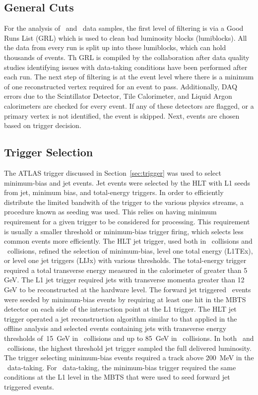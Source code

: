 
\subsection{General Cuts}
For the analysis of \pp\ and \pPb\ data samples, the first level of filtering is via a Good Runs List (GRL) which is used to clean bad luminosity blocks (lumiblocks). All the data from every run is split up into these lumiblocks, which can hold thousands of events. Th GRL is compiled by the collaboration after data quality studies identifying issues with data-taking conditions have been performed after each run. The next step of filtering is at the event level where there is a minimum of one reconstructed vertex required for an event to pass. Additionally, DAQ errors due to the Scintillator Detector, Tile Calorimeter, and Liquid Argon calorimeters are checked for every event. If any of these detectors are flagged, or a primary vertex is not identified, the event is skipped. Next, events are chosen based on trigger decision.

\subsection{Trigger Selection}

The ATLAS trigger discussed in Section~\ref{sec:trigger} was used to select minimum-bias and jet events. Jet events were selected by the HLT with L1 seeds from jet, minimum bias, and total-energy triggers. In order to efficiently distribute the limited bandwith of the trigger to the various physics streams, a procedure known as seeding was used. This relies on having minimum requirement for a given trigger to be considered for processing. This requirement is usually a smaller threshold or minimum-bias trigger firing, which selects less common events more efficiently. The HLT jet trigger, used both in \pPb\ collisions and \pp\ collisions, refined the selection of minimum-bias, level one total energy (L1TEx), or level one jet triggers (LIJx) with various thresholds. The total-energy trigger required a total transverse energy measured in the calorimeter of greater than 5 GeV. The L1 jet trigger required jets with transverse momenta greater than 12 GeV to be reconstructed at the hardware level. The forward jet triggered \pPb\ events were seeded by minimum-bias events by requiring at least one hit in the MBTS detector on each side of the interaction point at the L1 trigger. The HLT jet trigger operated a jet reconstruction algorithm similar to that applied in the offline analysis and selected events containing jets with transverse energy thresholds of~15~GeV in \pPb\ collisions and up to 85~GeV in \pp\ collisions. In both \pp\ and \pPb\ collisions, the highest threshold jet trigger sampled the full delivered luminosity. The trigger selecting minimum-bias events required a track above 200~MeV in the \pp\ data-taking. For \pPb\ data-taking, the minimum-bias trigger required the same conditions at the L1 level in the MBTS that were used to seed forward jet triggered events. 
          
